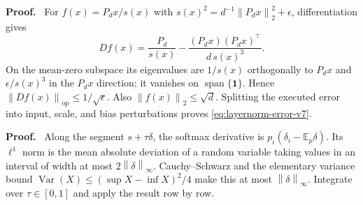\documentclass[twoside,11pt]{article}
\renewenvironment{proof}[1][Proof]{\par\noindent\textbf{#1.}\ }{\hfill\BlackBox\par\medskip}
\newcommand{\norm}[1]{\left\lVert #1\right\rVert}
\newcommand{\one}{\mathbf{1}}
\begin{document}
\begin{proof}
For
$f(x)=P_dx/s(x)$ with
$s(x)^2=d^{-1}\norm{P_dx}_2^2+\epsilon$, differentiation gives
\[
 Df(x)=\frac{P_d}{s(x)}
 -\frac{(P_dx)(P_dx)^\top}{d\,s(x)^3}.
\]
On the mean-zero subspace its eigenvalues are $1/s(x)$ orthogonally to
$P_dx$ and $\epsilon/s(x)^3$ in the $P_dx$ direction; it vanishes on
$\operatorname{span}\{\one\}$.  Hence $\norm{Df(x)}_{\mathrm{op}}
\le1/\sqrt\epsilon$.  Also $\norm{f(x)}_2\le\sqrt d$.  Splitting the executed
error into input, scale, and bias perturbations proves
\eqref{eq:layernorm-error-v7}.
\end{proof}


\begin{proof}
Along the segment $s+\tau\delta$, the softmax derivative is
$p_i(\delta_i-\mathbb E_p\delta)$.  Its $\ell^1$ norm is the mean absolute
deviation of a random variable taking values in an interval of width at most
$2\norm\delta_\infty$.  Cauchy--Schwarz and the elementary variance bound
$\operatorname{Var}(X)\le(\sup X-\inf X)^2/4$ make this at most
$\norm\delta_\infty$.  Integrate over
$\tau\in[0,1]$ and apply the result row by row.
\end{proof}
\end{document}
